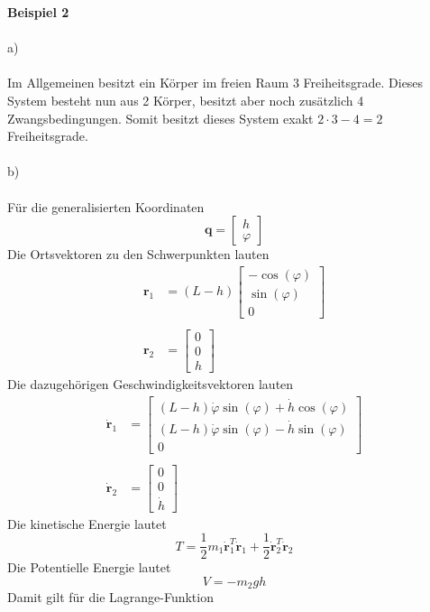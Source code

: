 \newpage
\noindent
\textbf{Beispiel 2}\\ \\
a)\\ \\
Im Allgemeinen besitzt ein Körper im freien Raum 3 Freiheitsgrade. Dieses System besteht nun aus 2 Körper, besitzt aber noch zusätzlich 4 Zwangsbedingungen. Somit besitzt dieses System exakt $2\cdot3 - 4 = 2$ Freiheitsgrade. \\ \\
b) \\ \\
Für die generalisierten Koordinaten
\[
	\textbf{q} = \begin{bmatrix}
		h \\
		\varphi
	\end{bmatrix}
\]
Die Ortsvektoren zu den Schwerpunkten lauten
\begin{align*}
	\textbf{r}_1 &= (L - h)\begin{bmatrix}
		-\cos(\varphi) \\
		\sin(\varphi) \\
		0
	\end{bmatrix}
	\\ \\
	\textbf{r}_2 &= \begin{bmatrix}
		0 \\
		0 \\
		h
	\end{bmatrix}
\end{align*}
Die dazugehörigen Geschwindigkeitsvektoren lauten
\begin{align*}
	\dot{\textbf{r}}_1 &= \begin{bmatrix}
		(L - h)\dot{\varphi}\sin(\varphi) + \dot{h}\cos(\varphi) \\
		(L - h)\dot{\varphi}\sin(\varphi) - \dot{h}\sin(\varphi) \\
		0
	\end{bmatrix}
	\\ \\
	\dot{\textbf{r}}_2 &= \begin{bmatrix}
		0 \\
		0 \\
		\dot{h}
	\end{bmatrix}
\end{align*}
Die kinetische Energie lautet
\[
	T = \frac{1}{2}m_1\dot{\textbf{r}}_1^T\dot{\textbf{r}}_1 + \frac{1}{2}\dot{\textbf{r}}_2^T\dot{\textbf{r}}_2
\]
Die Potentielle Energie lautet
\[
	V = -m_2gh
\]
Damit gilt für die Lagrange-Funktion
